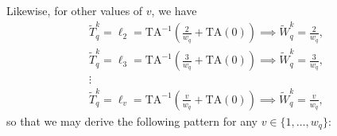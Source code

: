 \documentclass[hidelinks, nonatbib]{elsarticle}
\begin{document}
    Likewise, for other values of $v$, we have
    \begin{gather}
        \tilde{T}_{q}^{k}
        =
        \ell_2
        =
        \text{TA}^{-1}
        \left(
            \frac{2}{w_q}
            +
            \text{TA}(0)
        \right)
        \implies
        \tilde{W}_{q}^{k}
        =
        \frac{2}{w_q}
        ,
        \\
        \tilde{T}_{q}^{k}
        =
        \ell_3
        =
        \text{TA}^{-1}
        \left(
            \frac{3}{w_q}
            +
            \text{TA}(0)
        \right)
        \implies
        \tilde{W}_{q}^{k}
        =
        \frac{3}{w_q}
        ,
        \\
        \vdots
        \\
        \tilde{T}_{q}^{k}
        =
        \ell_{v}
        =
        \text{TA}^{-1}
        \left(
            \frac{v}{w_q}
            +
            \text{TA}(0)
        \right)
        \implies
        \tilde{W}_{q}^{k}
        =
        \frac{v}{w_q}
        ,
    \end{gather}
    so that we may derive the following pattern for any $v \in \{1, \dots, w_q\}$:
\end{document}
